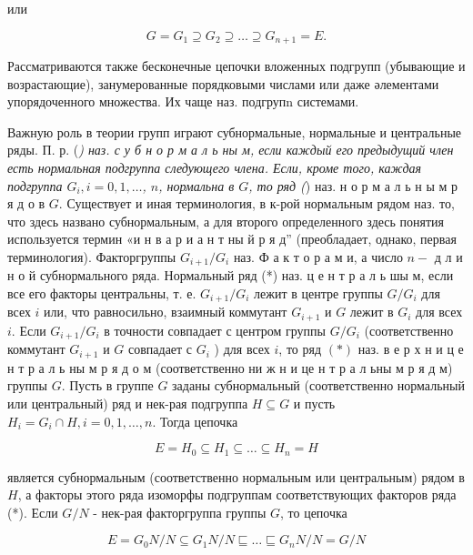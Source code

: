 \documentclass[10pt]{article}
\begin{document}
или



\[

G=G_{1} \supseteq G_{2} \supseteq \ldots \supseteq G_{n+1}=E .

\]



Рассматриваются также бесконечные цепочки вложенных подгрупп (убывающие и возрастающие), занумерованные порядковыми числами или даже әлементами упорядоченного множества. Их чаще наз. подгрупn системами.



Важную роль в теории групп играют субнормальные, нормальные и центральные ряды. П. р. (\textit{) наз. с у б н о р м а л ь ны м, если каждый его предыдущий член есть нормальная подгруппа следующего члена. Если, кроме того, каждая подгруппа $G_{i}, i=0,1, \ldots$, $n$, нормальна в $G$, то ряд (}) наз. н о р м а л ь н ы м р я д о в $G$. Существует и иная терминология, в к-рой нормальным рядом наз. то, что здесь названо субнормальным, а для второго определенного здесь понятия используется термин «и н в а р и а н т ны й р я д” (преобладает, однако, первая терминология). Факторгруппы $G_{i+1} / G_{i}$ наз. Ф а к т о р а м и, а число $n-$ д л и н о й субнормального ряда. Нормальный ряд (*) наз. ц е н т р а л ь шы м, если все его факторы центральны, т. е. $G_{i+1} / G_{i}$ лежит в центре группы $G / G_{i}$ для всех $i$ или, что равносильно, взаимный коммутант $G_{i+1}$ и $G$ лежит в $G_{i}$ для всех $i$. Если $G_{i+1} / G_{i}$ в точности совпадает с центром группы $G / G_{i}$ (соответственно коммутант $G_{i+1}$ и $G$ совпадает с $G_{i}$ ) для всех $i$, то ряд $(*)$ наз. в е р х н и ц е н т р а л ь ны м р я д о м (соответственно ни ж н и це н т р а л ьны м р я д м) группы $G$. Пусть в группе $G$ заданы субнормальный (соответственно нормальный или центральный) ряд и нек-рая подгруппа $H \subseteq G$ и пусть $H_{i}=G_{i} \cap H, i=0,1, \ldots, n$. Тогда цепочка



\[

E=H_{0} \subseteq H_{1} \subseteq \ldots \subseteq H_{n}=H

\]



является субнормальным (соответственно нормальным или центральным) рядом в $H$, а факторы этого ряда изоморфы подгруппам соответствующих факторов ряда (*). Если $G / N$ - нек-рая факторгруппа группы $G$, то цепочка



\[

E=G_{0} N / N \subseteq G_{1} N / N \sqsubseteq \ldots \sqsubseteq G_{n} N / N=G / N

\]
\end{document}
